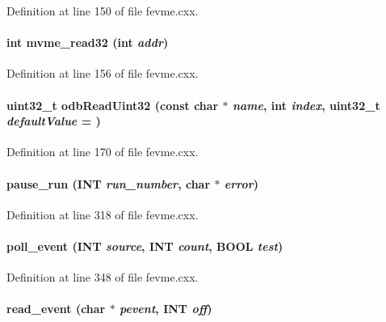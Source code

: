 Definition at line 150 of file fevme.cxx.
\paragraph[{mvme\_\-read32}]{\setlength{\rightskip}{0pt plus 5cm}int mvme\_\-read32 (int {\em addr})}\hfill\label{fevme_8cxx_a8602c7f09388bb774f2bf8b01e94a8a3}


Definition at line 156 of file fevme.cxx.
\paragraph[{odbReadUint32}]{\setlength{\rightskip}{0pt plus 5cm}uint32\_\-t odbReadUint32 (const char $\ast$ {\em name}, \/  int {\em index}, \/  uint32\_\-t {\em defaultValue} = {})}\hfill\label{fevme_8cxx_a7f37a65fccd900b63e6038c4a4d8246f}


Definition at line 170 of file fevme.cxx.
\paragraph[{pause\_\-run}]{ pause\_\-run ({\bf INT} {\em run\_\-number}, \/  char $\ast$ {\em error})}\hfill\label{fevme_8cxx_a164db20cf6c8c81e8c8ca50a590de436}


Definition at line 318 of file fevme.cxx.
\paragraph[{poll\_\-event}]{ poll\_\-event ({\bf INT} {\em source}, \/  {\bf INT} {\em count}, \/  {\bf BOOL} {\em test})}\hfill\label{fevme_8cxx_a98cc3257284af91fa0e8da10ddf227c8}


Definition at line 348 of file fevme.cxx.
\paragraph[{read\_\-event}]{ read\_\-event (char $\ast$ {\em pevent}, \/  {\bf INT} {\em off})}\hfill\label{fevme_8cxx_a29c24faa7974a6c3649087a361db89a2}


